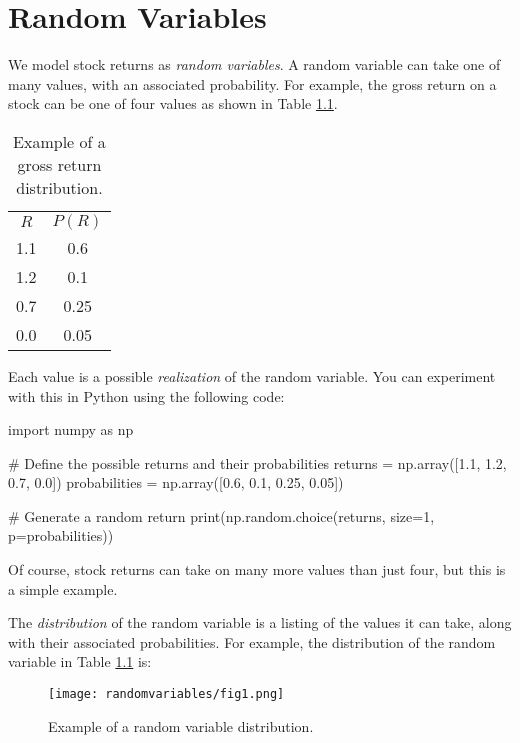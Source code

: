 \chapter{Random Variables}


We model stock returns as \textit{random variables}.
A random variable can take one of many values, with an 
associated probability. For example, the gross return on 
a stock can be one of four values as shown in Table \ref{tab:randomvariable}.

\begin{table}[!htbp]
    \centering
    \begin{tabular}{c c}
        $R$ & $P(R)$ \\
        1.1 & 0.6 \\
        1.2 & 0.1 \\
        0.7 & 0.25 \\
        0.0 & 0.05 \\
    \end{tabular}
    \caption{Example of a gross return distribution.}
    \label{tab:randomvariable}
\end{table}

Each value is a possible \textit{realization}
of the random variable. You can experiment with this in Python
using the following code:

\begin{python}
import numpy as np

# Define the possible returns and their probabilities
returns = np.array([1.1, 1.2, 0.7, 0.0])
probabilities = np.array([0.6, 0.1, 0.25, 0.05])

# Generate a random return
print(np.random.choice(returns, size=1, p=probabilities))

\end{python}

Of course, stock returns can take on many more values 
than just four, but this is a simple example.

The \textit{distribution} of the random variable is 
a listing of the values it can take, along with their
associated probabilities. For example, the distribution
of the random variable in Table \ref{tab:randomvariable}
is:

\begin{figure}[!htbp]
    \centering
    \texttt{[image: randomvariables/fig1.png]}
    \caption{Example of a random variable distribution.}
    \label{fig:randomvariable}
\end{figure}

